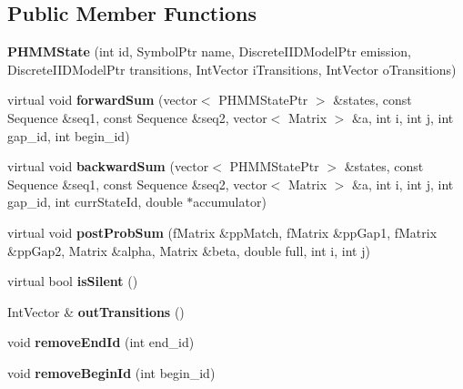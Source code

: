 \subsection*{Public Member Functions}
\begin{DoxyCompactItemize}
\item 
\mbox{\label{classtops_1_1PHMMState_aea2ade58a2d7649bebfa04230d0c40df}} 
{\bfseries P\+H\+M\+M\+State} (int id, Symbol\+Ptr name, Discrete\+I\+I\+D\+Model\+Ptr emission, Discrete\+I\+I\+D\+Model\+Ptr transitions, Int\+Vector i\+Transitions, Int\+Vector o\+Transitions)
\item 
\mbox{\label{classtops_1_1PHMMState_a83bc27e5d502a0cf0d81b7db8165d39a}} 
virtual void {\bfseries forward\+Sum} (vector$<$ P\+H\+M\+M\+State\+Ptr $>$ \&states, const Sequence \&seq1, const Sequence \&seq2, vector$<$ Matrix $>$ \&a, int i, int j, int gap\+\_\+id, int begin\+\_\+id)
\item 
\mbox{\label{classtops_1_1PHMMState_a3669ce018f36b9b1eef0353770bac7f5}} 
virtual void {\bfseries backward\+Sum} (vector$<$ P\+H\+M\+M\+State\+Ptr $>$ \&states, const Sequence \&seq1, const Sequence \&seq2, vector$<$ Matrix $>$ \&a, int i, int j, int gap\+\_\+id, int curr\+State\+Id, double $\ast$accumulator)
\item 
\mbox{\label{classtops_1_1PHMMState_ad3d366e7a5de1b6b3e93f222e0ea611c}} 
virtual void {\bfseries post\+Prob\+Sum} (f\+Matrix \&pp\+Match, f\+Matrix \&pp\+Gap1, f\+Matrix \&pp\+Gap2, Matrix \&alpha, Matrix \&beta, double full, int i, int j)
\item 
\mbox{\label{classtops_1_1PHMMState_abac6fd3d79a32bdfbdba7d4107860764}} 
virtual bool {\bfseries is\+Silent} ()
\item 
\mbox{\label{classtops_1_1PHMMState_abd8d1399276aec76728ba46c15ed0ffa}} 
Int\+Vector \& {\bfseries out\+Transitions} ()
\item 
\mbox{\label{classtops_1_1PHMMState_a6342b2283ea9df9257eca3f52b9d889e}} 
void {\bfseries remove\+End\+Id} (int end\+\_\+id)
\item 
\mbox{\label{classtops_1_1PHMMState_a7b873c1752dccfdca2de28596545d5db}} 
void {\bfseries remove\+Begin\+Id} (int begin\+\_\+id)
\end{DoxyCompactItemize}
